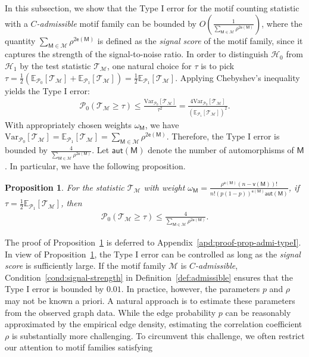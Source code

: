 \documentclass[letterpaper,11pt]{article}
\newtheorem{proposition}{Proposition}
\theoremstyle{definition}
\newcommand{\maH}{\mathcal{H}}
\newcommand{\maM}{\mathcal{M}}
\newcommand{\maP}{\mathcal{P}}
\newcommand{\maT}{\mathcal{T}}
\newcommand{\nbr}[1]{{\sf\color{red}[#1]}}
\newcommand{\en}{\mathsf{{e}}}
\newcommand{\vn}{\mathsf{{v}}}
\newcommand{\pth}[1]{\left( #1 \right)}
\newcommand{\qth}[1]{\left[ #1 \right]}
\newcommand{\sfM}{{\mathsf{M}}}
\newcommand{\aut}{\mathsf{aut}}
\def\var{\mathrm{Var}}
\def\E{\mathbb{E}}
\begin{document}
In this subsection, we show that the Type I error for the motif counting statistic with a \emph{$C$-admissible} motif family can be bounded by $O\pth{\frac{1}{\sum_{\sfM\in \maM} \rho^{2\en(\sfM)}}}$, where the quantity $\sum_{\sfM\in \maM} \rho^{2\en(\sfM)}$ is defined as the \emph{signal score} of the motif family, since it captures the strength of the signal-to-noise ratio. In order to distinguish $\maH_0$ from $\maH_1$ by the test statistic $\maT_\maM$, one natural choice for $\tau$ is to pick $\tau = \frac{1}{2}\pth{\E_{\maP_0}\qth{\maT_\maM}+\E_{\maP_1}\qth{\maT_\maM}}=\frac{1}{2}\E_{\maP_1}\qth{\maT_\maM}$. Applying Chebyshev's inequality yields the Type I error: \begin{align*}
    \maP_0\pth{\maT_\maM\ge \tau}\le \frac{\var_{\maP_0}\qth{\maT_\maM}}{\tau^2}=\frac{4\var_{\maP_0}\qth{\maT_\maM}}{\pth{\E_{\maP_1}\qth{\maT_\maM}}^2}.
\end{align*}
With appropriately chosen weights $\omega_\sfM$, we have $\var_{\maP_0}\qth{\maT_\maM} = \E_{\maP_1}\qth{\maT_\maM} =\sum_{\sfM\in \maM} \rho^{2\en(\sfM)}$. Therefore, the Type I error is bounded by $\frac{4}{\sum_{\sfM\in \maM} \rho^{2\en(\sfM)}}$. 
Let $\aut(\sfM)$ denote the number of automorphisms of $\sfM$.
In particular, we have the following proposition.
\begin{proposition}\label{prop:TypeI-admissible}
    For the statistic $\maT_\maM$ with weight $\omega_\sfM = \frac{\rho^{\en(\sfM)} (n-\vn(\sfM))!}{n! (p(1-p))^{\en(\sfM)}\aut(\sfM)}$, if $\tau = \frac{1}{2}\E_{\maP_1}\qth{\maT_\maM}$, then %
    \begin{align*}
        \maP_0\pth{\maT_\maM\ge \tau}\le \frac{4}{\sum_{\sfM\in \maM} \rho^{2\en(\sfM)}}.
    \end{align*}
\end{proposition}
The proof of Proposition~\ref{prop:TypeI-admissible} is deferred to Appendix~\ref{apd:proof-prop-admi-typeI}.
In view of Proposition~\ref{prop:TypeI-admissible}, the Type I error can be controlled as long as the \emph{signal score} is sufficiently large. 
If the motif family $\maM$ is \emph{$C$-admissible},
Condition~\ref{cond:signal-strength} in Definition~\ref{def:admissible} ensures that the Type I error is bounded by $0.01$. In practice, however, the parameters $p$ and $\rho$ may not be known a priori. A natural approach is to estimate these parameters from the observed graph data. While the edge probability $p$ can be reasonably approximated by the empirical edge density, estimating the correlation coefficient $\rho$ is substantially more challenging. To circumvent this challenge, we often restrict our attention to motif families satisfying
\end{document}
